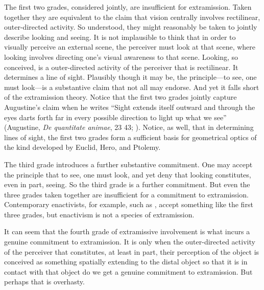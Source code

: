 \documentclass[12pt]{article}
\begin{document}
The first two grades, considered jointly, are insufficient for extramission. Taken together they are equivalent to the claim that vision centrally involves rectilinear, outer-directed activity. So understood, they might reasonably be taken to jointly describe looking and seeing. It is not implausible to think that in order to visually perceive an external scene, the perceiver must look at that scene, where looking involves directing one's visual awareness to that scene. Looking, so conceived, is a outer-directed activity of the perceiver that is rectilinear. It determines a line of sight. Plausibly though it may be, the principle---to see, one must look---is a substantive claim that not all may endorse. And yet it falls short of the extramission theory. Notice that the first two grades jointly capture Augustine's claim when he writes ``Sight extends itself outward and through the eyes darts forth far in every possible direction to light up what we see'' (Augustine, \emph{De quantitate animae}, 23 43; \citealt[66]{Colleran:1949ys}). Notice, as well, that in determining lines of sight, the first two grades form a sufficient basis for geometrical optics of the kind developed by Euclid, Hero, and Ptolemy. 

The third grade introduces a further substantive commitment. One may accept the principle that to see, one must look, and yet deny that looking constitutes, even in part, seeing. So the third grade is a further commitment. But even the three grades taken together are insufficient for a commitment to extramission. Contemporary enactivists, for example, such as \citet{Noe:2004fk}, accept something like the first three grades, but enactivism is not a species of extramission.

It can seem that the fourth grade of extramissive involvement is what incurs a genuine commitment to extramission. It is only when the outer-directed activity of the perceiver that constitutes, at least in part, their perception of the object is conceived as something spatially extending to the distal object so that it is in contact with that object do we get a genuine commitment to extramission. But perhaps that is overhasty. 
\end{document}
